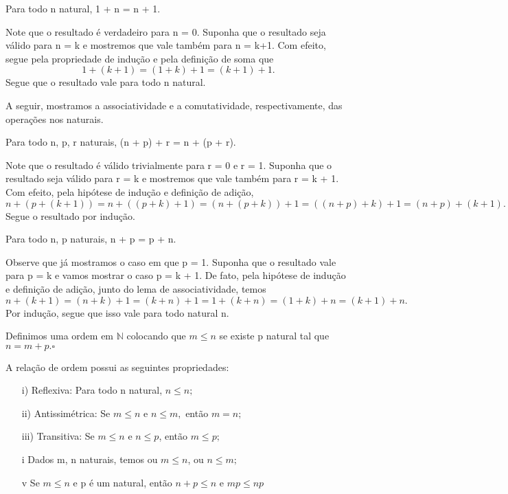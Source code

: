 \documentclass[analysis_notes.tex]{subfiles}
\begin{document}
\begin{lemma*}
	Para todo n natural, 1 + n = n + 1.
\end{lemma*}
\begin{proof*}
	Note que o resultado \'e verdadeiro para n = 0. Suponha que o resultado seja v\'alido para n = k e mostremos que
	vale tamb\'em para n = k+1. Com efeito, segue pela propriedade de indu\c c\~ao e pela defini\c c\~ao de soma que
	$$
		1 + (k + 1) = (1 + k) + 1 =  (k + 1) + 1.
	$$
	Segue que o resultado vale para todo n natural. \qedsymbol
\end{proof*}
A seguir, mostramos a associatividade e a comutatividade, respectivamente, das opera\c c\~oes nos naturais.
\begin{lemma*}
	Para todo n, p, r naturais, (n + p) + r = n + (p + r).
\end{lemma*}
\begin{proof*}
	Note que o resultado \'e v\'alido trivialmente para r = 0 e r = 1. Suponha que o resultado seja v\'alido para
	r = k e mostremos que vale tamb\'em para r = k + 1. Com efeito, pela hip\'otese de indu\c c\~ao e defini\c c\~ao de adi\c c\~ao,
	$$
		n + (p + (k + 1)) = n + ((p + k) + 1) = (n + (p + k)) + 1 = ((n + p) + k) + 1 = (n + p) + (k + 1).
	$$
	Segue o resultado por indu\c c\~ao. \qedsymbol
\end{proof*}
\begin{lemma*}
	Para todo n, p naturais, n + p = p + n.
\end{lemma*}
\begin{proof*}
	Observe que j\'a mostramos o caso em que p = 1. Suponha que o resultado vale para p = k e vamos mostrar o caso
	p = k + 1. De fato, pela hip\'otese de indu\c c\~ao e defini\c c\~ao de adi\c c\~ao, junto do lema de associatividade,
	temos
	$$
		n + (k + 1) = (n + k) + 1 = (k + n) + 1 = 1 + (k + n) = (1 + k) + n = (k + 1) + n.
	$$
	Por indu\c c\~ao, segue que isso vale para todo natural n. \qedsymbol
\end{proof*}

\begin{def*}
	Definimos uma ordem em $\mathbb{N}$ colocando que $m\leq{n}$ se existe p natural tal que $n = m + p. \square$
\end{def*}
A rela\c c\~ao de ordem possui as seguintes propriedades:
\begin{itemize}
	\item[i)] Reflexiva: Para todo n natural, $n\leq{n};$
	\item[ii)] Antissim\'etrica: Se $m\leq n$ e $n\leq m,$ ent\~ao $m = n;$
	\item[iii)] Transitiva: Se $m \leq n$ e $n \leq p$, ent\~ao $m\leq p;$
	\item[i] Dados m, n naturais, temos ou $m \leq n$, ou $n \leq m;$
	\item[v] Se $m \leq n$ e p \'e um natural, ent\~ao $n + p\leq n\text{ e } mp\leq np$
\end{itemize}
\end{document}

